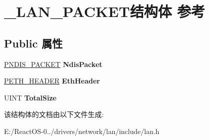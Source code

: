 \hypertarget{struct___l_a_n___p_a_c_k_e_t}{}\section{\+\_\+\+L\+A\+N\+\_\+\+P\+A\+C\+K\+E\+T结构体 参考}
\label{struct___l_a_n___p_a_c_k_e_t}
\subsection*{Public 属性}
\begin{DoxyCompactItemize}
\item 
\mbox{\label{struct___l_a_n___p_a_c_k_e_t_a966c9c92a85af8ab6e9c1132e07b9f82}} 
\hyperlink{struct___n_d_i_s___p_a_c_k_e_t}{P\+N\+D\+I\+S\+\_\+\+P\+A\+C\+K\+ET} {\bfseries Ndis\+Packet}
\item 
\mbox{\label{struct___l_a_n___p_a_c_k_e_t_a67d8d6b35d073ac3616eeff2a6fb71c9}} 
\hyperlink{struct___e_t_h___h_e_a_d_e_r}{P\+E\+T\+H\+\_\+\+H\+E\+A\+D\+ER} {\bfseries Eth\+Header}
\item 
\mbox{\label{struct___l_a_n___p_a_c_k_e_t_a30ed6499161cbbe6a212529a25c230b6}} 
U\+I\+NT {\bfseries Total\+Size}
\end{DoxyCompactItemize}


该结构体的文档由以下文件生成\+:\begin{DoxyCompactItemize}
\item 
E\+:/\+React\+O\+S-\/0../drivers/network/lan/include/lan.\+h\end{DoxyCompactItemize}
